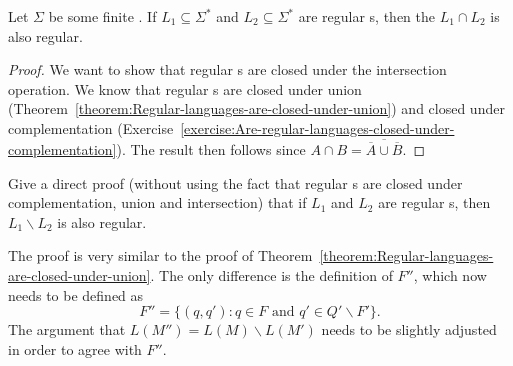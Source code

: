 \begin{flex}
\begin{corollary} \label{corollary:Regular-languages-are-closed-under-intersection}
Let $\Sigma$ be some finite . 
If $L_1 \subseteq \Sigma^*$ and $L_2 \subseteq \Sigma^*$ are regular s, then the  $L_1 \cap L_2$ is also regular.
\end{corollary}

\begin{proof}
We want to show that regular s are closed under the intersection operation. We know that regular s are closed under union (Theorem~\ref{theorem:Regular-languages-are-closed-under-union}) and closed under complementation (Exercise~\ref{exercise:Are-regular-languages-closed-under-complementation}). 
The result then follows since $A \cap B = \overline{\overline{A} \cup \overline{B}}$. 
\end{proof}
\end{flex}


\begin{flex}
\begin{exercise} \label{exercise:Direct-proof-that-regular-languages-are-closed-under-difference}
Give a direct proof (without using the fact that regular s are closed under complementation, union and intersection) that if $L_1$ and $L_2$ are regular s, then $L_1 \backslash L_2$ is also regular.
\end{exercise}

\begin{solution}
The proof is very similar to the proof of Theorem~\ref{theorem:Regular-languages-are-closed-under-union}. The only difference is the definition of $F''$, which now needs to be defined as
\[
F'' = \{(q, q') : q \in F \text{ and } q' \in Q' \backslash F'\}.
\]
The argument that $L(M'') = L(M) \backslash L(M')$ needs to be slightly adjusted in order to agree with $F''$.
\end{solution}
\end{flex}



